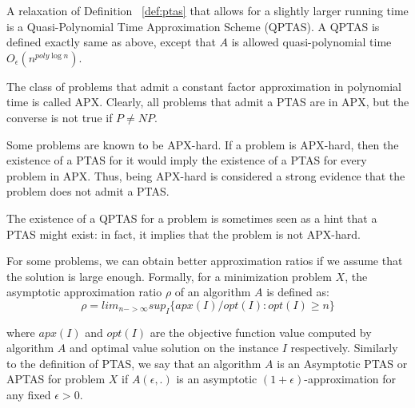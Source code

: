 A relaxation of Definition ~\ref{def:ptas} that allows for a
slightly larger running time is a Quasi-Polynomial Time Approximation Scheme
(QPTAS). A QPTAS is defined exactly same as above, except that $A$ is allowed quasi-polynomial
time $O_{\epsilon}(n^{poly \log n})$.

The class of problems that admit a constant factor approximation in polynomial time is called
APX. Clearly, all problems that admit a PTAS are in APX, but the converse
is not true if $P \neq NP$.

Some problems are known to be APX-hard. If a problem is APX-hard, then
the existence of a PTAS for it would imply the existence of a PTAS for every
problem in APX. Thus, being APX-hard is considered a strong evidence that
the problem does not admit a PTAS.

The existence of a QPTAS for a problem is sometimes seen as a hint that a
PTAS might exist: in fact, it implies that the problem is not APX-hard.

For some problems, we can obtain better approximation ratios if we assume
that the solution is large enough. Formally, for a minimization problem $X$, the
asymptotic approximation ratio $\rho$ of an algorithm $A$ is defined as:
\[
\rho = lim_{n -> \infty} sup_I \{ apx(I)/opt(I): opt(I) \ge n \}
\]

where $apx(I)$ and $opt(I)$ are the objective function value computed by algorithm $A$ and optimal value solution on the instance $I$ respectively.
Similarly to the definition of PTAS, we say that an algorithm $A$ is an
Asymptotic PTAS or APTAS for problem $X$ if $A(\epsilon, .)$ is an asymptotic $(1 + \epsilon)$-approximation for any fixed $\epsilon > 0$.

